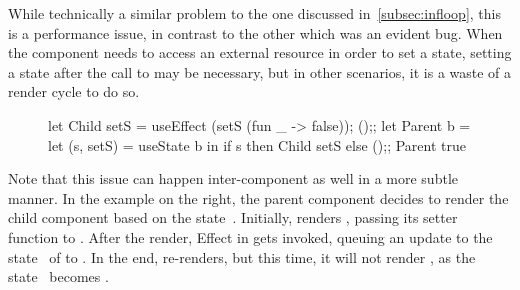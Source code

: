 While technically a similar problem to the one discussed in~\cref{subsec:infloop}, this is a performance issue, in contrast to the other which was an evident bug.
When the component needs to access an external resource in order to set a state, setting a state after the call to  may be necessary, but in other scenarios, it is a waste of a render cycle to do so.

\begin{figure}
  \vspace*{-\intextsep}
  \begin{reactcode}
let Child setS =
  useEffect (setS (fun _ -> false));
  ();;
let Parent b =
  let (s, setS) = useState b in
  if s then Child setS else ();;
Parent true
  \end{reactcode}
\end{figure}
Note that this issue can happen inter-component as well in a more subtle manner.
In the example on the right, the parent component  decides to render the child component  based on the state~.
Initially,  renders , passing its setter function  to .
After the render, Effect in  gets invoked, queuing an update to the state~ of  to .
In the end,  re-renders, but this time, it will not render , as the state~ becomes .
